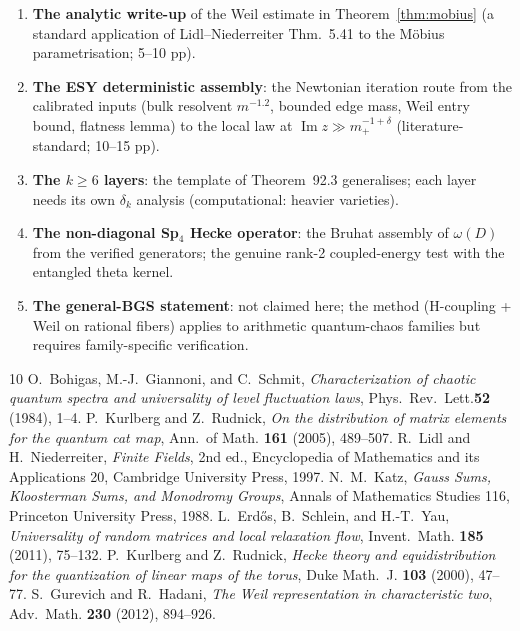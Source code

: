 \documentclass[11pt]{article}
\begin{document}
\begin{enumerate}
\item \textbf{The analytic write-up} of the Weil estimate in
Theorem~\ref{thm:mobius} (a standard application of Lidl--Niederreiter
Thm.~5.41 to the M\"obius parametrisation; 5--10 pp).
\item \textbf{The ESY deterministic assembly}: the Newtonian
iteration route from the calibrated inputs (bulk resolvent
$m^{-1.2}$, bounded edge mass, Weil entry bound, flatness lemma) to
the local law at $\operatorname{Im} z \gg m_+^{-1+\delta}$
(literature-standard; 10--15 pp).
\item \textbf{The $k \ge 6$ layers}: the template of
Theorem~92.3 generalises; each layer needs its own
$\delta_k$ analysis (computational: heavier varieties).
\item \textbf{The non-diagonal Sp$_4$ Hecke operator}: the Bruhat
assembly of $\omega(D)$ from the verified generators; the genuine
rank-2 coupled-energy test with the entangled theta kernel.
\item \textbf{The general-BGS statement}: not claimed here; the
method (H-coupling + Weil on rational fibers) applies to arithmetic
quantum-chaos families but requires family-specific verification.
\end{enumerate}

\begin{thebibliography}{10}
 O.~Bohigas, M.-J.~Giannoni, and C.~Schmit,
\emph{Characterization of chaotic quantum spectra and universality of
level fluctuation laws}, Phys.~Rev.~Lett.\textbf{52} (1984), 1--4.
 P.~Kurlberg and Z.~Rudnick, \emph{On the distribution
of matrix elements for the quantum cat map}, Ann.~of Math.
\textbf{161} (2005), 489--507.
 R.~Lidl and H.~Niederreiter, \emph{Finite Fields},
2nd ed., Encyclopedia of Mathematics and its Applications 20,
Cambridge University Press, 1997.
 N.~M.~Katz, \emph{Gauss Sums, Kloosterman Sums, and
Monodromy Groups}, Annals of Mathematics Studies 116, Princeton
University Press, 1988.
 L.~Erd\H{o}s, B.~Schlein, and H.-T.~Yau,
\emph{Universality of random matrices and local relaxation flow},
Invent.~Math. \textbf{185} (2011), 75--132.
 P.~Kurlberg and Z.~Rudnick, \emph{Hecke theory and
equidistribution for the quantization of linear maps of the torus},
Duke Math.~J. \textbf{103} (2000), 47--77.
 S.~Gurevich and R.~Hadani, \emph{The Weil
representation in characteristic two}, Adv.~Math. \textbf{230}
(2012), 894--926.
\end{thebibliography}
\end{document}
